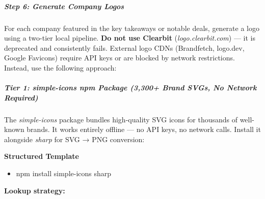 \documentclass[11pt]{article}
\begin{document}
\subparagraph{Step 6: Generate Company Logos}\mbox{}\par

For each company featured in the key takeaways or notable deals, generate a logo using a two-tier local pipeline. \textbf{Do not use Clearbit} (\emph{logo.clearbit.com}) — it is deprecated and consistently fails. External logo CDNs (Brandfetch, logo.dev, Google Favicons) require API keys or are blocked by network restrictions. Instead, use the following approach:


\subparagraph{Tier 1: \emph{simple-icons} npm Package (3,300+ Brand SVGs, No Network Required)}\mbox{}\par

The \emph{simple-icons} package bundles high-quality SVG icons for thousands of well-known brands. It works entirely offline — no API keys, no network calls. Install it alongside \emph{sharp} for SVG → PNG conversion:


\textbf{Structured Template}
\begin{itemize}[leftmargin=*,itemsep=2pt,topsep=2pt]
\item {} npm install simple-icons sharp
\end{itemize}

\textbf{Lookup strategy:}
\end{document}
